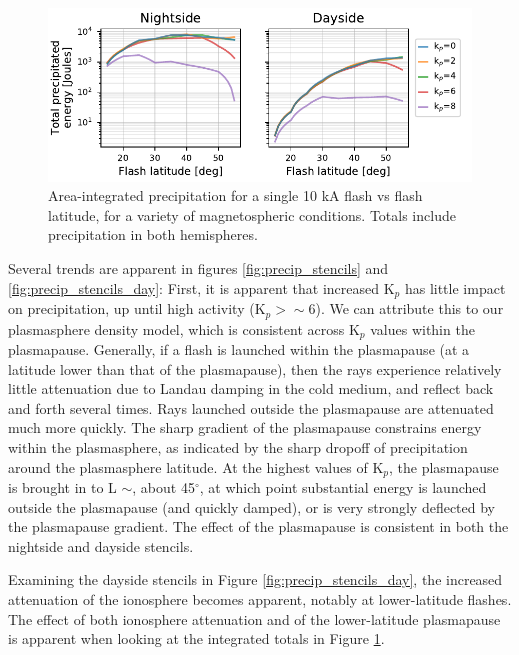 \begin{figure}[]
\begin{center}
\includegraphics{figures/total_energy_vs_latitude.pdf}
\caption[Total precipitated energy for a single flash]{Area-integrated precipitation for a single 10 kA flash vs flash latitude, for a variety of magnetospheric conditions. Totals include precipitation in both hemispheres.}
\label{fig:total_energy_per_stencil}
\end{center}
\end{figure}

Several trends are apparent in figures \ref{fig:precip_stencils} and \ref{fig:precip_stencils_day}: First, it is apparent that increased K$_p$ has little impact on precipitation, up until high activity (K$_p > \sim 6$). We can attribute this to our plasmasphere density model, which is consistent across K$_p$ values within the plasmapause. Generally, if a flash is launched within the plasmapause (at a latitude lower than that of the plasmapause), then the rays experience relatively little attenuation due to Landau damping in the cold medium, and reflect back and forth several times. Rays launched outside the plasmapause are attenuated much more quickly. The sharp gradient of the plasmapause constrains energy within the plasmasphere, as indicated by the sharp dropoff of precipitation around the plasmasphere latitude. At the highest values of K$_p$, the plasmapause is brought in to L $\sim$, about 45$^\circ$, at which point substantial energy is launched outside the plasmapause (and quickly damped), or is very strongly deflected by the plasmapause gradient. The effect of the plasmapause is consistent in both the nightside and dayside stencils.

Examining the dayside stencils in Figure \ref{fig:precip_stencils_day}, the increased attenuation of the ionosphere becomes apparent, notably at lower-latitude flashes. The effect of both ionosphere attenuation and of the lower-latitude plasmapause is apparent when looking at the integrated totals in Figure \ref{fig:total_energy_per_stencil}.

